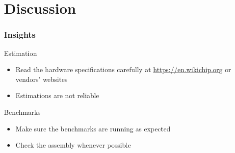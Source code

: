 \section{Discussion}
\begin{frame}
  \frametitle{Insights}
  \pause{} Estimation
  \begin{itemize}
  \item Read the hardware specifications carefully at
    \url{https://en.wikichip.org} or vendors' websites
  \item Estimations are \alert{not} reliable
  \end{itemize}
  \pause{} Benchmarks
  \begin{itemize}
  \item Make sure the benchmarks are running as expected
  \item Check the assembly whenever possible
  \end{itemize}
\end{frame}

